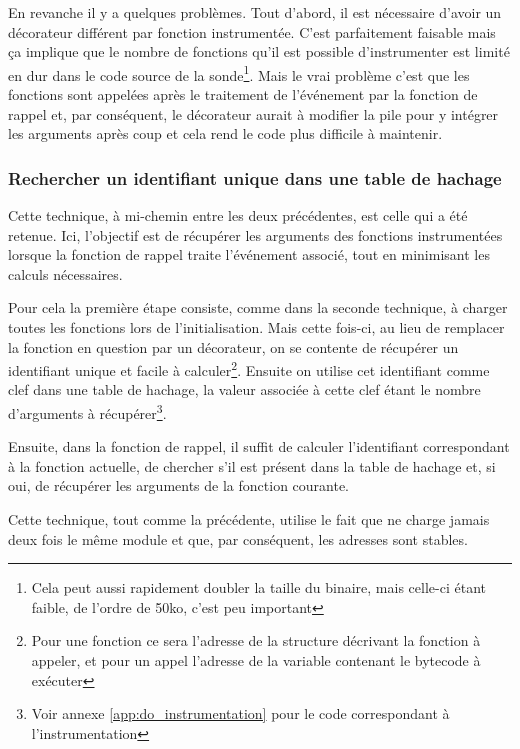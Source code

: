 En revanche il y a quelques problèmes. Tout d'abord, il est nécessaire d'avoir un décorateur différent par fonction instrumentée. C'est parfaitement faisable mais ça implique que le nombre de fonctions qu'il est possible d'instrumenter est limité en dur dans le code source de la sonde\footnote{Cela peut aussi rapidement doubler la taille du binaire, mais celle-ci étant faible, de l'ordre de 50ko, c'est peu important}. Mais le vrai problème c'est que les fonctions sont appelées après le traitement de l'événement par la fonction de rappel et, par conséquent, le décorateur aurait à modifier la pile pour y intégrer les arguments après coup et cela rend le code plus difficile à maintenir.

\subsubsection*{Rechercher un identifiant unique dans une table de hachage}
Cette technique, à mi-chemin entre les deux précédentes, est celle qui a été retenue. Ici, l'objectif est de récupérer les arguments des fonctions instrumentées lorsque la fonction de rappel traite l'événement associé, tout en minimisant les calculs nécessaires.

Pour cela la première étape consiste, comme dans la seconde technique, à charger toutes les fonctions lors de l’initialisation. Mais cette fois-ci, au lieu de remplacer la fonction en question par un décorateur, on se contente de récupérer un identifiant unique et facile à calculer\footnote{Pour une fonction \C ce sera l'adresse de la structure décrivant la fonction \C à appeler, et pour un appel \Python l'adresse de la variable contenant le bytecode à exécuter}. Ensuite on utilise cet identifiant comme clef dans une table de hachage, la valeur associée à cette clef étant le nombre d'arguments à récupérer\footnote{Voir annexe \vref{app:do_instrumentation} pour le code correspondant à l'instrumentation}.

Ensuite, dans la fonction de rappel, il suffit de calculer l'identifiant correspondant à la fonction actuelle, de chercher s'il est présent dans la table de hachage et, si oui, de récupérer les arguments de la fonction courante.

\begin{note}
Cette technique, tout comme la précédente, utilise le fait que \Python ne charge jamais deux fois le même module et que, par conséquent, les adresses sont stables.
\end{note}

